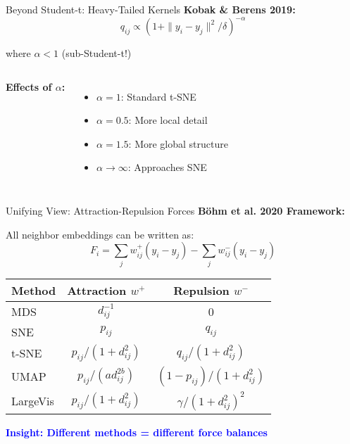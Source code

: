\documentclass[aspectratio=169]{beamer}
\newcommand{\conceptbox}[2]{\colorbox{#1!20}{\textcolor{#1}{\textbf{#2}}}}
\newcommand{\insight}[1]{\conceptbox{blue}{Insight: #1}}
\begin{document}
\begin{frame}{Beyond Student-t: Heavy-Tailed Kernels}
\textbf{Kobak \& Berens 2019:}
$$q_{ij} \propto (1 + \|y_i - y_j\|^2/\delta)^{-\alpha}$$

where $\alpha < 1$ (sub-Student-t!)

\begin{columns}
    \textbf{Effects of $\alpha$:}
    \begin{itemize}
        \item $\alpha = 1$: Standard t-SNE
        \item $\alpha = 0.5$: More local detail
        \item $\alpha = 1.5$: More global structure
        \item $\alpha \to \infty$: Approaches SNE
    \end{itemize}

    \begin{center}
    \end{center}
\end{columns}
\end{frame}

\begin{frame}{Unifying View: Attraction-Repulsion Forces}
\textbf{Böhm et al. 2020 Framework:}

All neighbor embeddings can be written as:
$$F_i = \sum_j w_{ij}^{+} (y_i - y_j) - \sum_j w_{ij}^{-} (y_i - y_j)$$

\begin{center}
\begin{tabular}{l|c|c}
\textbf{Method} & \textbf{Attraction $w^+$} & \textbf{Repulsion $w^-$} \\
\hline
MDS & $d_{ij}^{-1}$ & 0 \\
SNE & $p_{ij}$ & $q_{ij}$ \\
t-SNE & $p_{ij}/(1+d_{ij}^2)$ & $q_{ij}/(1+d_{ij}^2)$ \\
UMAP & $p_{ij}/(ad_{ij}^{2b})$ & $(1-p_{ij})/(1+d_{ij}^2)$ \\
LargeVis & $p_{ij}/(1+d_{ij}^2)$ & $\gamma/(1+d_{ij}^2)^2$ \\
\end{tabular}
\end{center}

\insight{Different methods = different force balances}
\end{frame}
\end{document}
